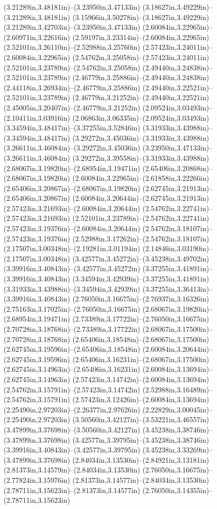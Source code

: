 (3.21289in,3.48181in)--(3.23950in,3.47133in) (3.18627in,3.49229in)--(3.21289in,3.48181in) (3.15966in,3.50278in)--(3.18627in,3.49229in) (3.21289in,3.42703in)--(3.23950in,3.47133in) (2.60084in,3.22965in)--(2.60971in,3.22616in) (2.59197in,3.23314in)--(2.60084in,3.22965in) (2.52101in,3.26110in)--(2.52988in,3.25760in) (2.57423in,3.24011in)--(2.60084in,3.22965in) (2.54762in,3.25058in)--(2.57423in,3.24011in) (2.52101in,3.23789in)--(2.54762in,3.25058in) (2.49440in,3.24838in)--(2.52101in,3.23789in) (2.46779in,3.25886in)--(2.49440in,3.24838in) (2.44118in,3.26934in)--(2.46779in,3.25886in) (2.49440in,3.22521in)--(2.52101in,3.23789in) (2.46779in,3.21252in)--(2.49440in,3.22521in) (2.45005in,3.20407in)--(2.46779in,3.21252in) (2.09524in,3.03493in)--(2.10411in,3.03916in) (2.06863in,3.06335in)--(2.09524in,3.03493in) (3.34594in,3.48417in)--(3.37255in,3.52846in) (3.31933in,3.43988in)--(3.34594in,3.48417in) (3.29272in,3.45036in)--(3.31933in,3.43988in) (3.26611in,3.46084in)--(3.29272in,3.45036in) (3.23950in,3.47133in)--(3.26611in,3.46084in) (3.29272in,3.39558in)--(3.31933in,3.43988in) (2.68067in,3.19820in)--(2.68954in,3.19471in) (2.65406in,3.20868in)--(2.68067in,3.19820in) (2.60084in,3.22965in)--(2.61858in,3.22266in) (2.65406in,3.20867in)--(2.68067in,3.19820in) (2.62745in,3.21913in)--(2.65406in,3.20867in) (2.60084in,3.20644in)--(2.62745in,3.21913in) (2.57423in,3.21693in)--(2.60084in,3.20644in) (2.54762in,3.22741in)--(2.57423in,3.21693in) (2.52101in,3.23789in)--(2.54762in,3.22741in) (2.57423in,3.19376in)--(2.60084in,3.20644in) (2.54762in,3.18107in)--(2.57423in,3.19376in) (2.52988in,3.17262in)--(2.54762in,3.18107in) (2.17507in,3.00348in)--(2.19281in,3.01194in) (2.14846in,3.03190in)--(2.17507in,3.00348in) (3.42577in,3.45272in)--(3.45238in,3.49702in) (3.39916in,3.40843in)--(3.42577in,3.45272in) (3.37255in,3.41891in)--(3.39916in,3.40843in) (3.34594in,3.42939in)--(3.37255in,3.41891in) (3.31933in,3.43988in)--(3.34594in,3.42939in) (3.37255in,3.36413in)--(3.39916in,3.40843in) (2.76050in,3.16675in)--(2.76937in,3.16326in) (2.75163in,3.17025in)--(2.76050in,3.16675in) (2.68067in,3.19820in)--(2.68954in,3.19471in) (2.73389in,3.17722in)--(2.76050in,3.16675in) (2.70728in,3.18768in)--(2.73389in,3.17722in) (2.68067in,3.17500in)--(2.70728in,3.18768in) (2.65406in,3.18548in)--(2.68067in,3.17500in) (2.62745in,3.19596in)--(2.65406in,3.18548in) (2.60084in,3.20644in)--(2.62745in,3.19596in) (2.65406in,3.16231in)--(2.68067in,3.17500in) (2.62745in,3.14963in)--(2.65406in,3.16231in) (2.60084in,3.13694in)--(2.62745in,3.14963in) (2.57423in,3.14742in)--(2.60084in,3.13694in) (2.54762in,3.15791in)--(2.57423in,3.14742in) (2.52988in,3.16489in)--(2.54762in,3.15791in) (2.57423in,3.12426in)--(2.60084in,3.13694in) (2.25490in,2.97203in)--(2.26377in,2.97626in) (2.22829in,3.00045in)--(2.25490in,2.97203in) (3.50560in,3.42127in)--(3.53221in,3.46557in) (3.47899in,3.37698in)--(3.50560in,3.42127in) (3.45238in,3.38746in)--(3.47899in,3.37698in) (3.42577in,3.39795in)--(3.45238in,3.38746in) (3.39916in,3.40843in)--(3.42577in,3.39795in) (3.45238in,3.33269in)--(3.47899in,3.37698in) (2.84034in,3.13530in)--(2.84921in,3.13181in) (2.81373in,3.14579in)--(2.84034in,3.13530in) (2.76050in,3.16675in)--(2.77824in,3.15976in) (2.81373in,3.14577in)--(2.84034in,3.13530in) (2.78711in,3.15623in)--(2.81373in,3.14577in) (2.76050in,3.14355in)--(2.78711in,3.15623in) 